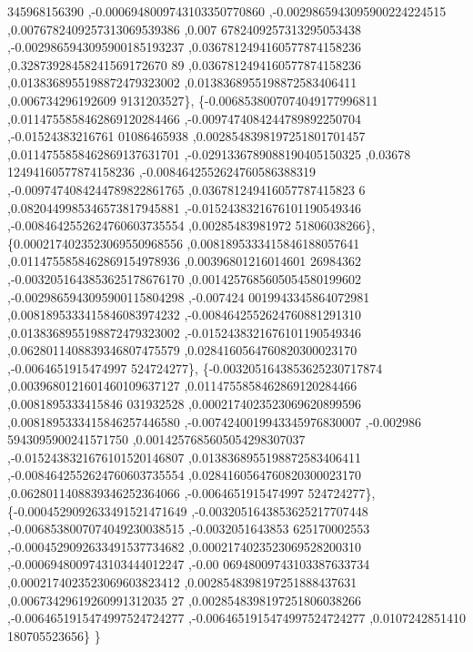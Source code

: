 \begin{DoxyCode}
      345968156390 ,-0.0006948009743103350770860 ,-0.0029865943095900224224515 ,0.0076782409257313069539386 ,0.007
      6782409257313295053438 ,-0.0029865943095900185193237 ,0.0367812494160577874158236 ,0.32873928458241569172670
      89 ,0.0367812494160577874158236 ,0.0138368955198872479323002 ,0.0138368955198872583406411 ,0.006734296192609
      9131203527\},
\{-0.0068538007074049177996811 ,0.0114755858462869120284466 ,-0.0097474084244789892250704 ,-0.01524383216761
      01086465938 ,0.0028548398197251801701457 ,0.0114755858462869137631701 ,-0.0291336789088190405150325 ,0.03678
      12494160577874158236 ,-0.0084642552624760586388319 ,-0.0097474084244789822861765 ,0.036781249416057787415823
      6 ,0.0820449985346573817945881 ,-0.0152438321676101190549346 ,-0.0084642552624760603735554 ,0.00285483981972
      51806038266\},
\{0.0002174023523069550968556 ,0.0081895333415846188057641 ,0.0114755858462869154978936 ,0.00396801216014601
      26984362 ,-0.0032051643853625178676170 ,0.0014257685605054580199602 ,-0.0029865943095900115804298 ,-0.007424
      0019943345864072981 ,0.0081895333415846083974232 ,-0.0084642552624760881291310 ,0.0138368955198872479323002 
      ,-0.0152438321676101190549346 ,0.0628011408839346807475579 ,0.0284160564760820300023170 ,-0.0064651915474997
      524724277\},
\{-0.0032051643853625230717874 ,0.0039680121601460109637127 ,0.0114755858462869120284466 ,0.0081895333415846
      031932528 ,0.0002174023523069620899596 ,0.0081895333415846257446580 ,-0.0074240019943345976830007 ,-0.002986
      5943095900241571750 ,0.0014257685605054298307037 ,-0.0152438321676101520146807 ,0.0138368955198872583406411 
      ,-0.0084642552624760603735554 ,0.0284160564760820300023170 ,0.0628011408839346252364066 ,-0.0064651915474997
      524724277\},
\{-0.0004529092633491521471649 ,-0.0032051643853625217707448 ,-0.0068538007074049230038515 ,-0.0032051643853
      625170002553 ,-0.0004529092633491537734682 ,0.0002174023523069528200310 ,-0.0006948009743103444012247 ,-0.00
      06948009743103387633734 ,0.0002174023523069603823412 ,0.0028548398197251888437631 ,0.00673429619260991312035
      27 ,0.0028548398197251806038266 ,-0.0064651915474997524724277 ,-0.0064651915474997524724277 ,0.0107242851410
      180705523656\}
\}
\end{DoxyCode}
\mbox{\label{a00455_aa030b0a9fe619a48647119bacea600e0}} 
